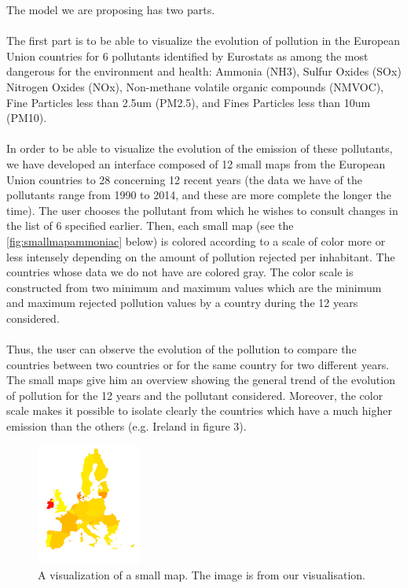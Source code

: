 \documentclass[preprint,journal]{vgtc}       %
\begin{document}
The model we are proposing has two parts.

\paragraph{}
The first part is to be able to visualize the evolution of pollution in the European Union countries for 6 pollutants identified by Eurostats as among the most dangerous for the environment and health: Ammonia (NH3), Sulfur Oxides (SOx) Nitrogen Oxides (NOx), Non-methane volatile organic compounds (NMVOC), Fine Particles less than 2.5um (PM2.5), and Fines Particles less than 10um (PM10).

\paragraph{}
In order to be able to visualize the evolution of the emission of these pollutants, we have developed an interface composed of 12 small maps from the European Union countries to 28 concerning 12 recent years (the data we have of the pollutants range from 1990 to 2014, and these are more complete the longer the time). The user chooses the pollutant from which he wishes to consult changes in the list of 6 specified earlier. Then, each small map (see the \autoref{fig:smallmapammoniac} below) is colored according to a scale of color more or less intensely depending on the amount of pollution rejected per inhabitant. The countries whose data we do not have are colored gray. The color scale is constructed from two minimum and maximum values ​​which are the minimum and maximum rejected pollution values ​​by a country during the 12 years considered.

\paragraph{}
Thus, the user can observe the evolution of the pollution to compare the countries between two countries or for the same country for two different years. The small maps give him an overview showing the general trend of the evolution of pollution for the 12 years and the pollutant considered. Moreover, the color scale makes it possible to isolate clearly the countries which have a much higher emission than the others (e.g. Ireland in figure 3).

\begin{figure}[H]
 \centering %
 \includegraphics[width=130px]{smallmap}
 \caption{A visualization of a small map. The image is from our visualisation.}
 \label{fig:smallmapammoniac}
\end{figure}
\end{document}
